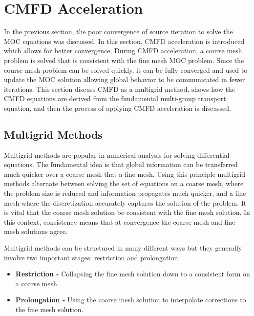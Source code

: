 \chapter{CMFD Acceleration}
\label{chap:cmfd}

In the previous section, the poor convergence of source iteration to solve the \ac{MOC} equations was discussed. In this section, \ac{CMFD} acceleration is introduced which allows for better convergence. During \ac{CMFD} acceleration, a course mesh problem is solved that is consistent with the fine mesh \ac{MOC} problem. Since the course mesh problem can be solved quickly, it can be fully converged and used to update the \ac{MOC} solution allowing global behavior to be communicated in fewer iterations. This section discuss \ac{CMFD} as a multigrid method, shows how the \ac{CMFD} equations are derived from the fundamental multi-group transport equation, and then the process of applying \ac{CMFD} acceleration is discussed.

\section{Multigrid Methods}
\label{sec:multigrid}

Multigrid methods are popular in numerical analysis for solving differential equations. The fundamental idea is that global information can be transferred much quicker over a coarse mesh that a fine mesh. Using this principle multigrid methods alternate between solving the set of equations on a coarse mesh, where the problem size is reduced and information propagates much quicker, and a fine mesh where the discretization accurately captures the solution of the problem. It is vital that the coarse mesh solution be consistent with the fine mesh solution. In this context, consistency means that at convergence the coarse mesh and fine mesh solutions agree.

Multigrid methods can be structured in many different ways but they generally involve two important stages: restriction and prolongation.
\begin{itemize}
	\item \textbf{Restriction - } Collapsing the fine mesh solution down to a consistent form on a coarse mesh.
	\item \textbf{Prolongation - } Using the coarse mesh solution to interpolate corrections to the fine mesh solution.
\end{itemize}

